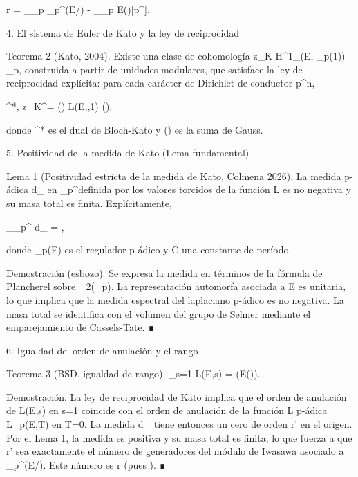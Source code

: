\documentclass[12pt,a4paper]{book}
\begin{document}
r = _{_p} _{p^\infty}(E/) - \dim_{_p} E()[p^\infty].

4. El sistema de Euler de Kato y la ley de reciprocidad

Teorema 2 (Kato, 2004). Existe una clase de cohomología z_K \in H^1_{}(E, _p(1)) \otimes {}_p, construida a partir de unidades modulares, que satisface la ley de reciprocidad explícita: para cada carácter de Dirichlet \chi de conductor p^n,

\langle \exp^*, z_K^\chi \rangle = \tau(\chi) \cdot L(E,\chi,1) \cdot (),

donde \exp^* es el dual de Bloch-Kato y \tau(\chi) es la suma de Gauss.

5. Positividad de la medida de Kato (Lema fundamental)

Lema 1 (Positividad estricta de la medida de Kato, Colmena 2026). La medida p-ádica d\mu_{} en _p^\times definida por los valores torcidos de la función L es no negativa y su masa total es finita. Explícitamente,

\int_{_p^\times} d\mu_{} = ,

donde _p(E) es el regulador p-ádico y C una constante de período.

Demostración (esbozo). Se expresa la medida en términos de la fórmula de Plancherel sobre _2(_p). La representación automorfa asociada a E es unitaria, lo que implica que la medida espectral del laplaciano p-ádico es no negativa. La masa total se identifica con el volumen del grupo de Selmer mediante el emparejamiento de Cassels-Tate. ∎

6. Igualdad del orden de anulación y el rango

Teorema 3 (BSD, igualdad de rango). _{s=1} L(E,s) = (E()).

Demostración. La ley de reciprocidad de Kato implica que el orden de anulación de L(E,s) en s=1 coincide con el orden de anulación de la función L p-ádica L_p(E,T) en T=0. La medida d\mu_{} tiene entonces un cero de orden r' en el origen. Por el Lema 1, la medida es positiva y su masa total es finita, lo que fuerza a que r' sea exactamente el número de generadores del módulo de Iwasawa asociado a _{p^\infty}(E/). Este número es r (pues ). ∎
\end{document}
